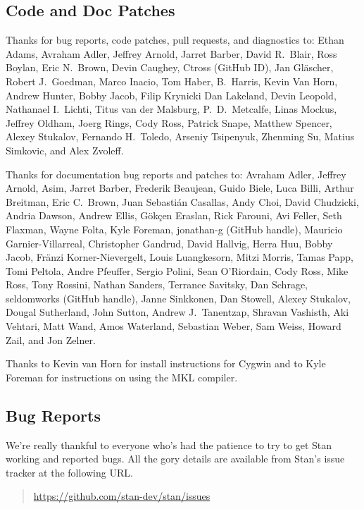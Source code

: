 \subsection*{Code  and Doc Patches}

Thanks for bug reports, code patches, pull requests, and diagnostics
to: 
Ethan Adams, 
Avraham Adler,
Jeffrey Arnold, 
Jarret Barber, 
David R.~Blair, 
Ross Boylan, 
Eric N.~Brown, 
Devin Caughey, 
Ctross (GitHub ID), 
Jan Gl\"ascher,
Robert J.\ Goedman, 
Marco Inacio, 
Tom Haber,
B.~Harris, 
Kevin Van Horn, 
Andrew Hunter,
Bobby Jacob, 
Filip Krynicki
Dan Lakeland, 
Devin Leopold, 
Nathanael I.~Lichti,
Titus van der Malsburg,
P.~D.~Metcalfe, 
Linas Mockus,
Jeffrey Oldham, 
Joerg Rings,
Cody Ross,
Patrick Snape,
Matthew Spencer,
Alexey Stukalov,
Fernando H.~Toledo, 
Arseniy Tsipenyuk,
Zhenming Su,
Matius Simkovic, and
Alex Zvoleff.

Thanks for documentation bug reports and patches to: 
Avraham Adler,
Jeffrey Arnold,
Asim, 
Jarret Barber, 
Frederik Beaujean,
Guido Biele,
Luca Billi, 
Arthur Breitman,
Eric C.~Brown, 
Juan Sebasti\'an Casallas,
Andy Choi, 
David Chudzicki,
Andria Dawson, 
Andrew Ellis,
G\"{o}k\c{c}en Eraslan,
Rick Farouni,
Avi Feller,
Seth Flaxman, 
Wayne Folta, 
Kyle Foreman,
jonathan-g (GitHub handle),
Mauricio Garnier-Villarreal,
Christopher Gandrud,
David Hallvig,
Herra Huu,
Bobby Jacob,
Fr\"anzi Korner-Nievergelt,
Louis Luangkesorn, 
Mitzi Morris,
Tamas Papp, 
Tomi Peltola,
Andre Pfeuffer,
Sergio Polini,
Sean O'Riordain, 
Cody Ross, 
Mike Ross, 
Tony Rossini,
Nathan Sanders, 
Terrance Savitsky,
Dan Schrage,
seldomworks (GitHub handle),
Janne Sinkkonen, 
Dan Stowell, 
Alexey Stukalov,
Dougal Sutherland, 
John Sutton,
Andrew J.~Tanentzap,
Shravan Vashisth, 
Aki Vehtari,
Matt Wand,
Amos Waterland,
Sebastian Weber, 
Sam Weiss,
Howard Zail, and
Jon Zelner.

Thanks to Kevin van Horn for install instructions for Cygwin and to
Kyle Foreman for instructions on using the MKL compiler.


\subsection*{Bug Reports}

We're really thankful to everyone who's had the patience to try
to get Stan working and reported bugs.  All the gory details are
available from Stan's issue tracker at the following URL.
%
\begin{quote}
\url{https://github.com/stan-dev/stan/issues}
\end{quote}




